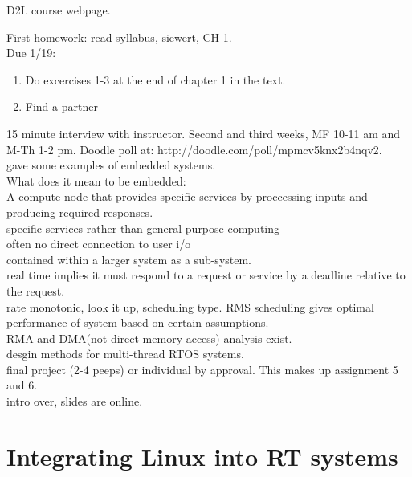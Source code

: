 \documentclass{article}
\begin{document}
D2L course webpage.

First homework: read syllabus, siewert, CH 1.\\
Due 1/19:
\begin{enumerate}
    \item Do excercises 1-3 at the end of chapter 1 in the text.
    \item Find a partner
\end{enumerate}

15 minute interview with instructor. Second and third weeks, MF 10-11 am and M-Th 1-2 pm. Doodle poll at:
http://doodle.com/poll/mpmcv5knx2b4nqv2.\\


gave some examples of embedded systems.\\

What does it mean to be embedded:\\
A compute node that provides specific services by proccessing inputs and producing required responses.\\
specific services rather than general purpose computing\\
often no direct connection to user i/o\\
contained within a larger system as a sub-system.\\

real time implies it must respond to a request or service by a deadline relative to the request.\\
rate monotonic, look it up, scheduling type. RMS scheduling gives optimal performance of system based on certain assumptions.\\

RMA and DMA(not direct memory access) analysis exist.\\
desgin methods for multi-thread RTOS systems.\\

final project (2-4 peeps) or individual by approval. This makes up assignment 5 and 6.\\

intro over, slides are online.\\

\section*{Integrating Linux into RT systems}
\end{document}
